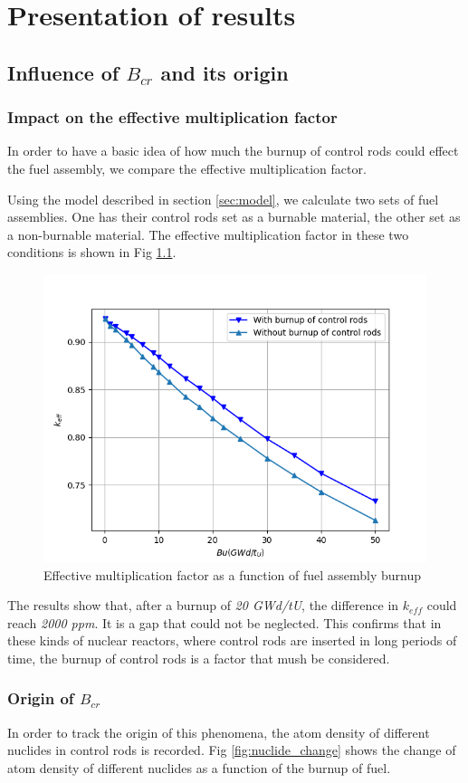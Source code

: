 \chapter{Presentation of results}
\label{cha:results}
\section{Influence of $B_{cr}$ and its origin}
\label{sec:reactivity}

\subsection{Impact on the effective multiplication factor}
In order to have a basic idea of how much the burnup of control rods
could effect the fuel assembly, we compare the effective multiplication factor.

Using the model described in section \ref{sec:model},
we calculate two sets of fuel assemblies.
One has their control rods set as a burnable material,
the other set as a non-burnable material.
The effective multiplication factor in these two conditions is shown in Fig \ref{fig:k_bu}.
\begin{figure}[!htb]
    \centering\includegraphics[width=0.5\linewidth]{Figs/keff_bu_dififBcr.png}
    \caption{Effective multiplication factor as a function of fuel assembly burnup}
    \label{fig:k_bu}
\end{figure}

The results show that, after a burnup of \textit{20 GWd/tU},
the difference in $k_{eff}$ could reach \textit{2000 ppm}.
It is a gap that could not be neglected.
This confirms that in these kinds of nuclear reactors, where control rods are inserted in
long periods of time, the burnup of control rods is a factor that mush be considered.


\subsection{Origin of $B_{cr}$}
\label{sec:material}
In order to track the origin of this phenomena,
the atom density of different nuclides in control rods is recorded.
Fig \ref{fig:nuclide_change} shows the change of atom density of different
nuclides as a function of the burnup of fuel.

